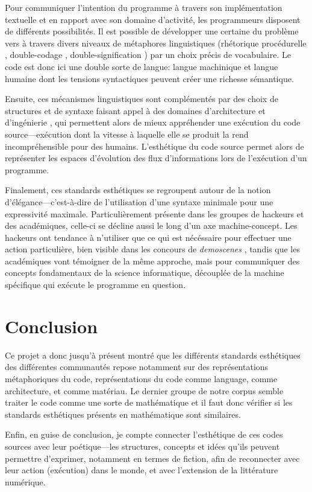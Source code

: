 \documentclass{article}
\begin{document}
Pour communiquer l'intention du programme à travers son implémentation textuelle et en rapport avec son domaine d'activité, les programmeurs disposent de différents possibilités. Il est possible de développer une certaine du problème vers à travers divers niveaux de métaphores linguistiques (rhétorique procédurelle \citep{bogost_rhetoric_2007}, double-codage \citep{cox_speaking_2013}, double-signification \citep{paloque-berges_poetique_2009}) par un choix précis de vocabulaire. Le code est donc ici une double sorte de langue: langue machinique et langue humaine dont les tensions syntactiques peuvent créer une richesse sémantique.

Ensuite, ces mécanismes linguistiques sont complémentés par des choix de structures et de syntaxe faisant appel à des domaines d'architecture et d'ingénierie \citep{gabriel_patterns_1998,schummer_aesthetic_2009}, qui permettent alors de mieux appréhender une exécution du code source—exécution dont la vitesse à laquelle elle se produit la rend incompréhensible pour des humains. L'esthétique du code source permet alors de représenter les espaces d'évolution des flux d'informations lors de l'exécution d'un programme.

Finalement, ces standards esthétiques se regroupent autour de la notion d'élégance—c'est-à-dire de l'utilisation d'une syntaxe minimale pour une expressivité maximale. Particulièrement présente dans les groupes de hackeurs et des académiques, celle-ci se décline aussi le long d'un axe machine-concept. Les hackeurs ont tendance à n'utiliser que ce qui est nécéssaire pour effectuer une action particulière, bien visible dans les concours de \emph{demoscenes} \citep{kudra_aoc_2020}, tandis que les académiques vont témoigner de la même approche, mais pour communiquer des concepts fondamentaux de la science informatique, découplée de la machine spécifique qui exécute le programme en question.


\section{Conclusion}

Ce projet a donc jusqu'à présent montré que les différents standards esthétiques des différentes communautés repose notamment sur des représentations métaphoriques du code, représentations du code comme language, comme architecture, et comme matériau. Le dernier groupe de notre corpus semble traiter le code comme une sorte de mathématique et il faut donc vérifier si les standards esthétiques présents en mathématique \citep{rota_phenomenology_1997} sont similaires. 

Enfin, en guise de conclusion, je compte connecter l'esthétique de ces codes sources avec leur poétique—les structures, concepts et idées qu'ils peuvent permettre d'exprimer, notamment en termes de fiction, afin de reconnecter avec leur action (exécution) dans le monde, et avec l'extension de la littérature numérique.

\pagebreak



\end{document}

